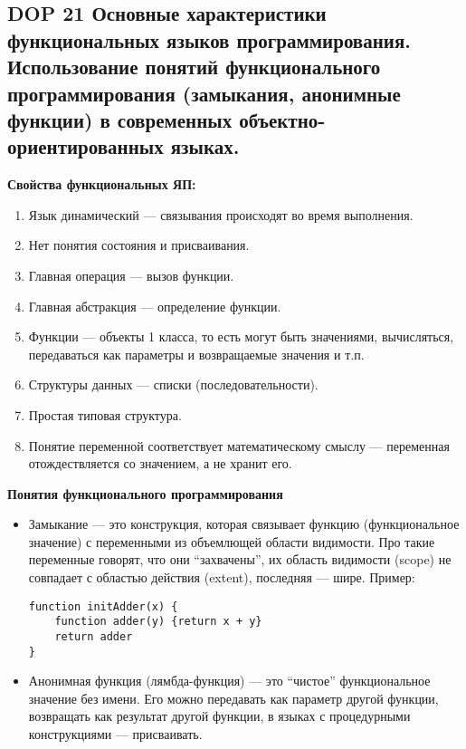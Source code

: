 \subsection{DOP 21 Основные  характеристики  функциональных  языков  программирования.  Использование  понятий функционального  программирования  (замыкания,  анонимные функции)  в  современных  объектно-ориентированных языках.}

\textbf{Свойства функциональных ЯП:}
\begin{enumerate}
    \item Язык динамический --- связывания происходят во время выполнения.
    \item Нет понятия состояния и присваивания.
    \item Главная операция --- вызов функции.
    \item Главная абстракция --- определение функции.
    \item Функции --- объекты 1 класса, то есть могут быть значениями, вычисляться, передаваться как параметры и возвращаемые значения и т.п.
    \item Структуры данных --- списки (последовательности).
    \item Простая типовая структура.
    \item Понятие переменной соответствует математическому смыслу --- переменная отождествляется со значением, а не хранит его.
\end{enumerate}

\textbf{Понятия функционального программирования}

\begin{itemize}
    \item Замыкание --- это конструкция, которая связывает функцию (функциональное значение) с переменными из объемлющей области видимости.
    Про такие переменные говорят, что они ``захвачены'', их область видимости (scope) не совпадает с областью действия (extent), последняя --- шире.
    Пример:
    \begin{lstlisting}
function initAdder(x) {
    function adder(y) {return x + y}
    return adder
}
    \end{lstlisting}
    \item Анонимная функция (лямбда-функция) --- это ``чистое'' функциональное значение без имени.
    Его можно передавать как параметр другой функции, возвращать как результат другой функции, в языках с процедурными конструкциями --- присваивать.
\end{itemize}

